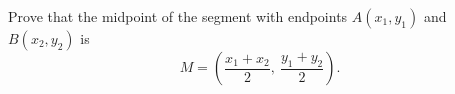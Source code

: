 Prove that the midpoint of the segment with endpoints $A(x_1,y_1)$ and $B(x_2,y_2)$ is
\[
M=\left(\dfrac{x_1+x_2}{2},\ \dfrac{y_1+y_2}{2}\right).
\]
